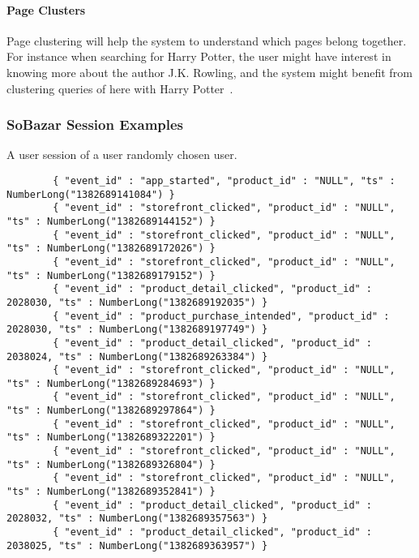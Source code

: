         \paragraph{Page Clusters} %
        \label{subp:page_clusters}
            Page clustering will help the system to understand which pages belong together.
            For instance when searching for Harry Potter, the user might have interest in knowing more about the author J.K. Rowling, and the system might benefit from clustering queries of here with Harry Potter~\cite{Zhang:2006:MSE:1135777.1136004}.


\subsubsection{SoBazar Session Examples} %
    \label{par:session_examples}
    A user session of a user randomly chosen user.
    \begin{lstlisting}
        { "event_id" : "app_started", "product_id" : "NULL", "ts" : NumberLong("1382689141084") }
        { "event_id" : "storefront_clicked", "product_id" : "NULL", "ts" : NumberLong("1382689144152") }
        { "event_id" : "storefront_clicked", "product_id" : "NULL", "ts" : NumberLong("1382689172026") }
        { "event_id" : "storefront_clicked", "product_id" : "NULL", "ts" : NumberLong("1382689179152") }
        { "event_id" : "product_detail_clicked", "product_id" : 2028030, "ts" : NumberLong("1382689192035") }
        { "event_id" : "product_purchase_intended", "product_id" : 2028030, "ts" : NumberLong("1382689197749") }
        { "event_id" : "product_detail_clicked", "product_id" : 2038024, "ts" : NumberLong("1382689263384") }
        { "event_id" : "storefront_clicked", "product_id" : "NULL", "ts" : NumberLong("1382689284693") }
        { "event_id" : "storefront_clicked", "product_id" : "NULL", "ts" : NumberLong("1382689297864") }
        { "event_id" : "storefront_clicked", "product_id" : "NULL", "ts" : NumberLong("1382689322201") }
        { "event_id" : "storefront_clicked", "product_id" : "NULL", "ts" : NumberLong("1382689326804") }
        { "event_id" : "storefront_clicked", "product_id" : "NULL", "ts" : NumberLong("1382689352841") }
        { "event_id" : "product_detail_clicked", "product_id" : 2028032, "ts" : NumberLong("1382689357563") }
        { "event_id" : "product_detail_clicked", "product_id" : 2038025, "ts" : NumberLong("1382689363957") }
    \end{lstlisting}

